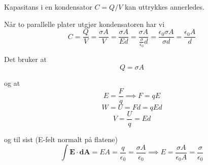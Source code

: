 Kapasitans i en kondensator $C = Q/V$ kan uttrykkes annerledes.

Når to parallelle plater utgjør kondensatoren har vi
$$C = \frac{Q}{V}
    = \frac{\sigma A}{V}
    = \frac{\sigma A}{E d}
    = \frac{\sigma A}{\frac{\sigma}{\epsilon_0}d}
    = \frac{\epsilon_0 \sigma A}{\sigma d}
    = \frac{\epsilon_0 A}{d}$$

Det bruker at
$$Q = \sigma A$$

og at
$$E = \frac{F}{q} \implies F = q E$$
$$W = U = Fd = q E d$$
$$V = \frac{U}{q} = E d$$

og til sist (E-felt normalt på flatene)
$$\int \mathbf{E} \cdot \mathbf{dA}
  = EA
  = \frac{q}{\epsilon_0}
  = \frac{\sigma A}{\epsilon_0}
  \implies
  E = \frac{\sigma A}{\epsilon_0 A}
    = \frac{\sigma}{\epsilon_0}$$
